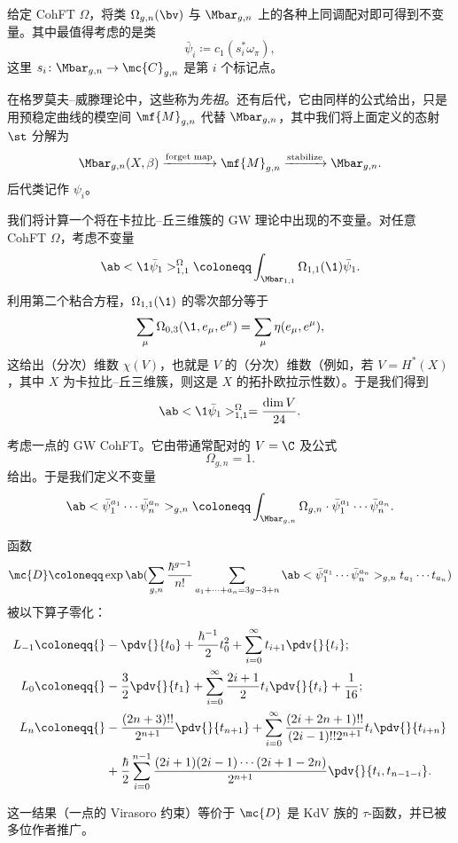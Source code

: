 给定 CohFT $\Omega$，将类 $\Omega_{g,n}(\bv)$ 与 $\Mbar_{g,n}$ 上的各种上同调配对即可得到不变量。其中最值得考虑的是类
\[ \bar{\psi}_i \coloneqq c_1( s_i^* \omega_{\pi} ), \]
这里 $s_i \colon \Mbar_{g,n} \to \mc{C}_{g,n}$ 是第 $i$ 个标记点。

\begin{rmk}
    在格罗莫夫–威滕理论中，这些称为\textit{先祖}。还有后代，它由同样的公式给出，只是用预稳定曲线的模空间 $\mf{M}_{g,n}$ 代替 $\Mbar_{g,n}$，其中我们将上面定义的态射 $\st$ 分解为
    \[ \Mbar_{g,n}(X,\beta) \xrightarrow{\text{forget map}} \mf{M}_{g,n} \xrightarrow{\text{stabilize}} \Mbar_{g,n}. \]
    后代类记作 $\psi_i$。
\end{rmk}

\begin{exm}
    我们将计算一个将在卡拉比–丘三维簇的 GW 理论中出现的不变量。对任意 CohFT $\Omega$，考虑不变量
    \[ \ab<\1\bar{\psi}_1>_{1,1}^{\Omega}\coloneqq \int_{\Mbar_{1,1}} \Omega_{1,1}(\1)\bar{\psi}_1. \]
    利用第二个粘合方程，$\Omega_{1,1}(\1)$ 的零次部分等于
    \[ \sum_{\mu} \Omega_{0,3}(\1, e_{\mu}, e^{\mu}) = \sum_{\mu} \eta(e_{\mu}, e^{\mu}), \]
    这给出（分次）维数 $\chi(V)$，也就是 $V$ 的（分次）维数（例如，若 \(V = H^*(X)\)，其中 \(X\) 为卡拉比–丘三维簇，则这是 \(X\) 的拓扑欧拉示性数）。于是我们得到
    \[ \ab<\1\bar{\psi}_1>_{1,1}^{\Omega} = \frac{\dim V}{24}. \]
\end{exm}

\begin{exm}
    考虑一点的 GW CohFT。它由带通常配对的 $V = \C$ 及公式
    \[ \Omega_{g,n} = 1. \]
    给出。于是我们定义不变量
    \[ \ab<\bar{\psi}_1^{a_1} \cdots \bar{\psi}_n^{a_n}>_{g,n} \coloneqq \int_{\Mbar_{g,n}} \Omega_{g,n} \cdot \bar{\psi}_1^{a_1} \cdots \bar{\psi}_n^{a_n}. \]
    \begin{thm}
        函数
        \[ \mc{D} \coloneqq \exp \ab(\sum_{g,n} \frac{\hbar^{g-1}}{n!}\sum_{a_1 + \cdots + a_n = 3g-3+n} \ab<\bar{\psi}_1^{a_1} \cdots \bar{\psi}_n^{a_n}>_{g,n} t_{a_1}\cdots t_{a_n}) \]
        被以下算子零化：
        \begin{align*}
            L_{-1} \coloneqq{}& -\pdv{}{t_0} + \frac{\hbar^{-1}}{2} t_0^2 + \sum_{i=0}^{\infty} t_{i+1} \pdv{}{t_i};\\
            L_0 \coloneqq{}& -\frac{3}{2} \pdv{}{t_1} + \sum_{i=0}^{\infty} \frac{2i+1}{2} t_i \pdv{}{t_i} + \frac{1}{16};\\
            L_n \coloneqq{}& -\frac{(2n+3)!!}{2^{n+1}} \pdv{}{t_{n+1}} + \sum_{i=0}^{\infty} \frac{(2i+2n+1)!!}{(2i-1)!! 2^{n+1}} t_i \pdv{}{t_{i+n}} \\
            &+ \frac{\hbar}{2} \sum_{i=0}^{n-1} \frac{(2i+1) (2i-1) \cdots (2i+1-2n)}{2^{n+1}} \pdv{}{t_i,t_{n-1-i}}.
        \end{align*}
    \end{thm}
\end{exm}

\begin{rmk}
    这一结果（一点的 Virasoro 约束）等价于 $\mc{D}$ 是 KdV 族的 \(\tau\)-函数，并已被多位作者推广。
\end{rmk}



